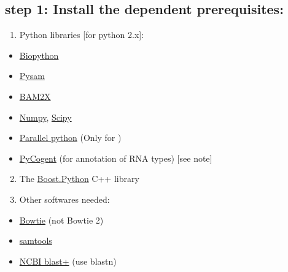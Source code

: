 \documentclass[letterpaper,10pt,english]{sphinxmanual}
\begin{document}
\subsection{step 1: Install the dependent prerequisites:}
\label{Stitch-seq-tools:step-1-install-the-dependent-prerequisites}\begin{enumerate}
\item {} 
Python libraries {[}for python 2.x{]}:

\end{enumerate}
\begin{itemize}
\item {} 
\href{http://biopython.org/wiki/Main\_Page}{Biopython}

\item {} 
\href{https://code.google.com/p/pysam/}{Pysam}

\item {} 
\href{http://bam2xwiki.appspot.com/Welcome}{BAM2X}

\item {} 
\href{http://www.numpy.org/}{Numpy}, \href{http://www.scipy.org/scipylib/index.html}{Scipy}

\item {} 
\href{http://www.parallelpython.com/}{Parallel python} (Only for )

\item {} 
\href{http://pycogent.org/}{PyCogent} (for annotation of RNA types) {[}see note{]}

\end{itemize}
\begin{enumerate}
\setcounter{enumi}{1}
\item {} 
The \href{http://www.boost.org/doc/libs/1\_54\_0/libs/python/doc/index.html}{Boost.Python} C++ library

\item {} 
Other softwares needed:

\end{enumerate}
\begin{itemize}
\item {} 
\href{http://bowtie-bio.sourceforge.net/index.shtml}{Bowtie} (not Bowtie 2)

\item {} 
\href{http://samtools.sourceforge.net/}{samtools}

\item {} 
\href{ftp://ftp.ncbi.nlm.nih.gov/blast/executables/blast+/LATEST/}{NCBI blast+} (use blastn)

\end{itemize}
\end{document}
